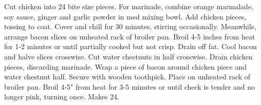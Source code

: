 \begin{minipage}{\linewidth}
\end{minipage}\par\begin{minipage}{\linewidth}  
{Cut chicken into 24 bite size pieces. For marinade, combine orange marmalade, soy sauce, ginger and garlic powder in med mixing bowl. Add chicken pieces, tossing to coat. Cover and chill for 30 minutes, stirring occasionally. Meanwhile, arrange bacon slices on unheated rack of broiler pan. Broil 4-5 inches from heat for 1-2 minutes or until partially cooked but not crisp. Drain off fat. Cool bacon and halve slices crosswise. Cut water chestnuts in half crosswise. Drain chicken pieces, discarding marinade. Wrap a piece of bacon around chicken piece and water chestnut half. Secure with wooden toothpick. Place on unheated rack of broiler pan. Broil 4-5" from heat for 3-5 minutes or until check is tender and no longer pink, turning once. Makes 24.}



\end{minipage}
